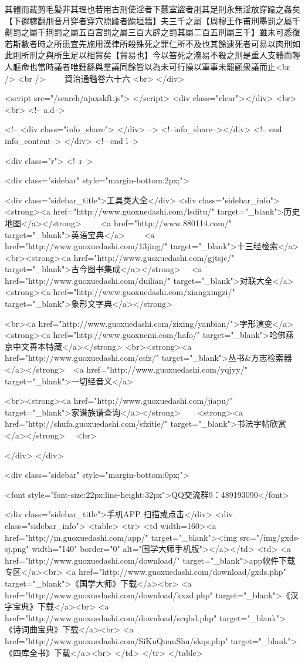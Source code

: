 其體而裁剪毛髪非其理也若用古刑使淫者下蠶室盜者刖其足則永無淫放穿踰之姦矣【下遐稼翻刖音月穿者穿穴隙踰者踰垣牆】夫三千之屬【周穆王作甫刑墨罰之屬千劓罰之屬千剕罰之屬五百宫罰之屬三百大辟之罰其屬二百五刑屬三千】雖未可悉復若斯數者時之所患宜先施用漢律所殺殊死之罪仁所不及也其餘逮死者可易以肉刑如此則所刑之與所生足以相貿矣【貿易也】今以笞死之灋易不殺之刑是重人支體而輕人軀命也當時議者唯鍾繇與羣議同餘皆以為未可行操以軍事未罷顧衆議而止<br />
<br />
　　資治通鑑卷六十六  <br>
   </div> 

<script src="/search/ajaxskft.js"> </script>
 <div class="clear"></div>
<br>
<br>
 <!-- a.d-->

 <!--
<div class="info_share">
</div> 
-->
 <!--info_share--></div>   <!-- end info_content-->
  </div> <!-- end l-->

<div class="r">   <!--r-->



<div class="sidebar"  style="margin-bottom:2px;">

 
<div class="sidebar_title">工具类大全</div>
<div class="sidebar_info">
<strong><a href="http://www.guoxuedashi.com/lsditu/" target="_blank">历史地图</a></strong>　　
<a href="http://www.880114.com/" target="_blank">英语宝典</a>　　
<a href="http://www.guoxuedashi.com/13jing/" target="_blank">十三经检索</a>　
<br><strong><a href="http://www.guoxuedashi.com/gjtsjc/" target="_blank">古今图书集成</a></strong>　
<a href="http://www.guoxuedashi.com/duilian/" target="_blank">对联大全</a>　<strong><a href="http://www.guoxuedashi.com/xiangxingzi/" target="_blank">象形文字典</a></strong>　

<br><a href="http://www.guoxuedashi.com/zixing/yanbian/">字形演变</a>　　<strong><a href="http://www.guoxuemi.com/hafo/" target="_blank">哈佛燕京中文善本特藏</a></strong>
<br><strong><a href="http://www.guoxuedashi.com/csfz/" target="_blank">丛书&方志检索器</a></strong>　<a href="http://www.guoxuedashi.com/yqjyy/" target="_blank">一切经音义</a>　　

<br><strong><a href="http://www.guoxuedashi.com/jiapu/" target="_blank">家谱族谱查询</a></strong>　　<strong><a href="http://shufa.guoxuedashi.com/sfzitie/" target="_blank">书法字帖欣赏</a></strong>　
<br>

</div>
</div>


<div class="sidebar" style="margin-bottom:0px;">

<font style="font-size:22px;line-height:32px">QQ交流群9：489193090</font>


<div class="sidebar_title">手机APP 扫描或点击</div>
<div class="sidebar_info">
<table>
<tr>
	<td width=160><a href="http://m.guoxuedashi.com/app/" target="_blank"><img src="/img/gxds-sj.png" width="140"  border="0" alt="国学大师手机版"></a></td>
	<td>
<a href="http://www.guoxuedashi.com/download/" target="_blank">app软件下载专区</a><br>
<a href="http://www.guoxuedashi.com/download/gxds.php" target="_blank">《国学大师》下载</a><br>
<a href="http://www.guoxuedashi.com/download/kxzd.php" target="_blank">《汉字宝典》下载</a><br>
<a href="http://www.guoxuedashi.com/download/scqbd.php" target="_blank">《诗词曲宝典》下载</a><br>
<a href="http://www.guoxuedashi.com/SiKuQuanShu/skqs.php" target="_blank">《四库全书》下载</a><br>
</td>
</tr>
</table>

